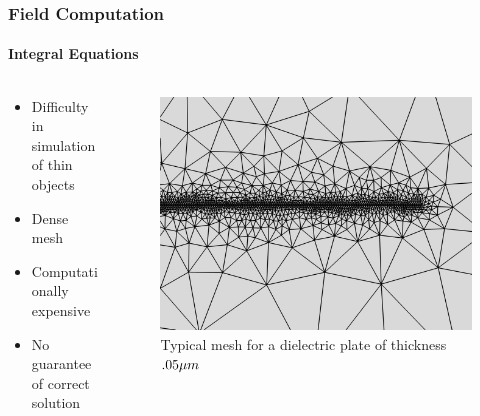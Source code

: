 \documentclass[mathserif,18pt,xcolor=table]{beamer}
\begin{document}
    \begin{frame}
      \frametitle{Field Computation}
      \framesubtitle{Integral Equations}
      \begin{columns} %
        \begin{column}[T]{.5\textwidth}
          \begin{itemize}
            \item Difficulty in simulation of thin objects
            \item Dense mesh
            \item Computationally expensive
            \item No guarantee of correct solution
          \end{itemize}
        \end{column}
        \begin{column}[T]{.5\textwidth}
          \begin{figure}[!t]
             \noindent
             \includegraphics[width=1\textwidth]{figures/mesh.png}
             \caption{Typical mesh for a dielectric plate of thickness $.05 \mu m$}
             \label{fig:mesh}
          \end{figure}
          \end{column}%
        \end{columns}
      \end{frame}
\end{document}
